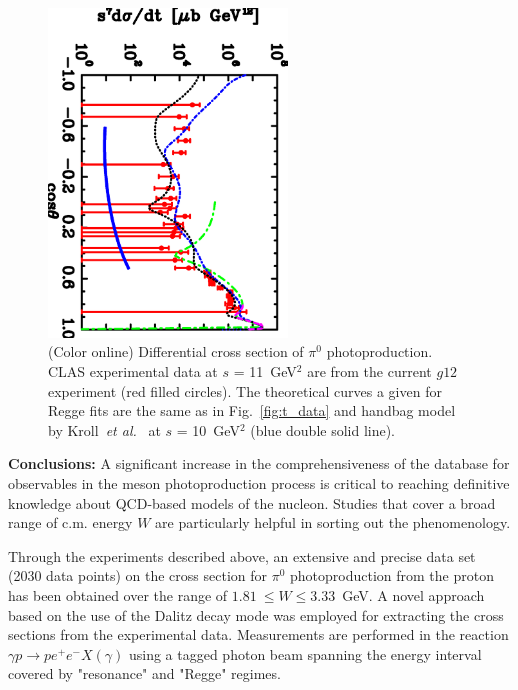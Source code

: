 \documentclass[aps,prc,twocolumn,floatfix,showpacs,preprintnumbers,amsmath,amssymb,superscriptaddress]{revtex4-1}
\begin{document}
\begin{figure}[htb!]
\centerline{
        \includegraphics[width=2.5in, angle=90]{kroll.eps}}

        \caption {(Color online) Differential cross section 
		of $\pi^0$ photoproduction. CLAS experimental 
		data at $s$ = 11~GeV$^2$ are from the 
		current $g12$ experiment (red filled circles).  
		The theoretical curves a given for Regge 
		fits are the same as in 
		Fig.~\protect\ref{fig:t_data} and handbag model 
		by Kroll~\protect\textit{et 
		al.}~\protect\cite{Kroll} at $s$ = 10~GeV$^2$ 
		(blue double solid line).} 
		\label{fig:kroll}
\end{figure}

\textbf{Conclusions:} A significant increase in the 
comprehensiveness of the database for observables in the meson 
photoproduction process is critical to reaching definitive 
knowledge about QCD-based models of the nucleon. Studies that 
cover a broad range of c.m. energy $W$ are particularly 
helpful in sorting out the phenomenology.

Through the experiments described above, an extensive and
precise data set (2030 data points) on the cross section for 
$\pi^0$ photoproduction from the proton has been obtained over 
the range of $1.81~\leq W\leq 3.33$~GeV. A novel approach based 
on the use of the Dalitz decay mode was employed for extracting the 
cross sections from the experimental data. Measurements are 
performed in the reaction $\gamma p\to pe^+e^-X(\gamma)$ using a 
tagged photon beam spanning the energy interval covered by 
"resonance" and "Regge" regimes.
\end{document}
